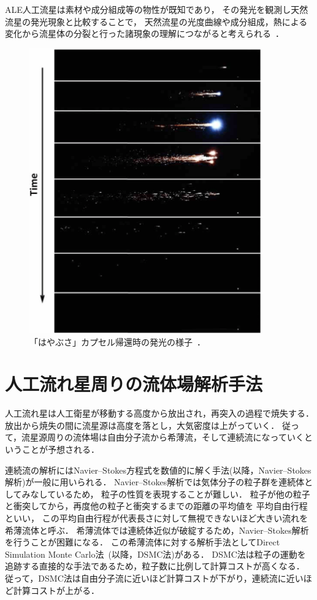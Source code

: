 ALE人工流星は素材や成分組成等の物性が既知であり，
その発光を観測し天然流星の発光現象と比較することで，
天然流星の光度曲線や成分組成，熱による変化から流星体の分裂と行った諸現象の理解につながると考えられる~\cite{jenniskens2000meteors}．

\begin{figure}[H]
    \centering
    \includegraphics[width=10cm]{fig/intro/hayabusa.png}
    \caption{「はやぶさ」カプセル帰還時の発光の様子~\cite{grinstead2011airborne}．}
    \label{fig:hayabusa}
\end{figure}



\section{人工流れ星周りの流体場解析手法}

人工流れ星は人工衛星が移動する高度から放出され，再突入の過程で焼失する．
放出から焼失の間に流星源は高度を落とし，大気密度は上がっていく．
従って，流星源周りの流体場は自由分子流から希薄流，そして連続流になっていくということが予想される．

連続流の解析にはNavier–Stokes方程式を数値的に解く手法(以降，Navier–Stokes解析)が一般に用いられる．
Navier–Stokes解析では気体分子の粒子群を連続体としてみなしているため，
粒子の性質を表現することが難しい．
粒子が他の粒子と衝突してから，再度他の粒子と衝突するまでの距離の平均値を
平均自由行程といい，
この平均自由行程が代表長さに対して無視できないほど大きい流れを
希薄流体と呼ぶ．
希薄流体では連続体近似が破綻するため，Navier–Stokes解析を行うことが困難になる．
この希薄流体に対する解析手法としてDirect Simulation Monte Carlo法~\cite{bird1994molecular}(以降，DSMC法)がある．
DSMC法は粒子の運動を追跡する直接的な手法であるため，粒子数に比例して計算コストが高くなる．
従って，DSMC法は自由分子流に近いほど計算コストが下がり，連続流に近いほど計算コストが上がる．

